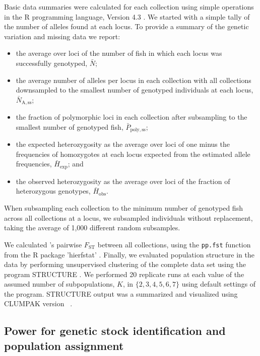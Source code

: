 Basic data summaries were calculated for each collection
using simple operations in the R programming language, Version 4.3
\citep{rcore}. We started with a simple tally of the number of alleles
found at each locus.  To provide a summary of the genetic variation and
missing data we report:
\begin {itemize}
\item the average over loci of the number of fish
in which each locus was successfully genotyped, $\bar{N}$;
\item the average number of alleles per locus in each collection with all collections
downsampled to the smallest number of genotyped individuals at each
locus, $\bar{N}_\mathrm{A,ss}$;
\item the fraction of polymorphic
loci in each collection after subsampling to the smallest number of genotyped
fish, $\bar{P}_\mathrm{poly,ss}$;
\item the expected heterozygosity as the average over loci
of one minus the frequencies of homozygotes at each locus expected from the
estimated allele frequencies, $\bar{H}_\mathrm{exp}$; and 
\item the observed heterozygosity as the average over
loci of the fraction of heterozygous genotypes, $\bar{H}_\mathrm{obs}$.
\end{itemize}
When subsampling each collection to the minimum number of genotyped
fish across all collections at a locus, we subsampled individuals without
replacement, taking the average of 1,000 different random subsamples.  

We calculated \citet{weir1984estimating}'s pairwise $F_\mathrm{ST}$ between
all collections, using the {\footnotesize\tt pp.fst} function from the R
package 'hierfstat' \citep{hierfstat}. Finally, we evaluated population
structure in the data by performing unsupervised clustering of
the complete data set
using the program STRUCTURE \citep{pritchard2000inference,falush2003inference}.
We performed 20 replicate runs at each value of the assumed number of
subpopulations, $K$, in $\{2, 3, 4, 5, 6, 7\}$ 
using default settings of the program.  STRUCTURE output was
a summarized and visualized using CLUMPAK version~
\citep{kopelman2015clumpak}.






\subsection*{Power for genetic stock identification and population assignment}

